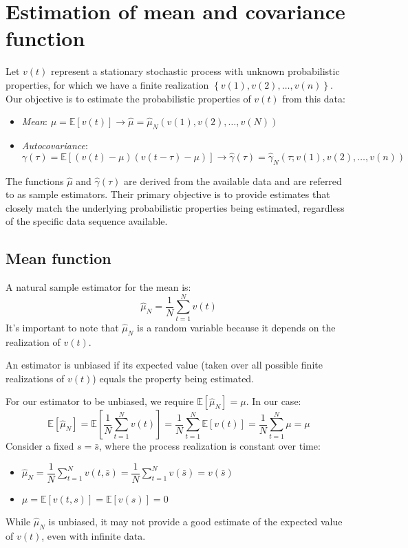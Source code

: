 \section{Estimation of mean and covariance function}

Let $v(t)$ represent a stationary stochastic process with unknown probabilistic properties, for which we have a finite realization $\left\{ v(1),v(2),\dots,v(n) \right\}$. 
Our objective is to estimate the probabilistic properties of $v(t)$ from this data:
\begin{itemize}
    \item \textit{Mean}: $\mu=\mathbb{E}\left[ v(t) \right]\rightarrow\hat{\mu}=\hat{\mu}_N\left( v(1),v(2),\dots,v(N) \right)$
    \item \textit{Autocovariance}: $\gamma(\tau)=\mathbb{E}\left[\left(v(t)-\mu\right)\left(v(t-\tau)-\mu\right)\right] \rightarrow \hat{\gamma}(\tau)=\hat{\gamma}_N\left(\tau;v(1),v(2),\dots,v(n)\right)$
\end{itemize}
The functions $\hat{\mu}$ and $\hat{\gamma}(\tau)$ are derived from the available data and are referred to as sample estimators.
Their primary objective is to provide estimates that closely match the underlying probabilistic properties being estimated, regardless of the specific data sequence available.

\subsection{Mean function}
A natural sample estimator for the mean is:
\[\hat{\mu}_N=\dfrac{1}{N}\sum_{t=1}^Nv(t)\]
It's important to note that $\hat{\mu}_N$ is a random variable because it depends on the realization of  $v(t)$. 
\begin{definition}
    An estimator is unbiased if its expected value (taken over all possible finite realizations of $v(t)$) equals the property being estimated.
\end{definition}
For our estimator to be unbiased, we require $\mathbb{E}\left[ \hat{\mu}_N \right]=\mu$. 
In our case:
\[\mathbb{E}\left[ \hat{\mu}_N \right]=\mathbb{E}\left[ \dfrac{1}{N}\sum_{t=1}^Nv(t) \right]=\dfrac{1}{N}\sum_{t=1}^N\mathbb{E}\left[ v(t) \right]=\dfrac{1}{N}\sum_{t=1}^N \mu =\mu\]
Consider a fixed $s = \bar{s}$, where the process realization is constant over time:
\begin{itemize}
    \item $\hat{\mu}_N=\dfrac{1}{N}\sum_{t=1}^Nv(t,\bar{s})=\dfrac{1}{N}\sum_{t=1}^Nv(\bar{s})=v(\bar{s})$
    \item $\mu=\mathbb{E}\left[v(t,s)\right]=\mathbb{E}\left[v(s)\right]=0$
\end{itemize}
While $\hat{\mu}_N$  is unbiased, it may not provide a good estimate of the expected value of $v(t)$, even with infinite data.

